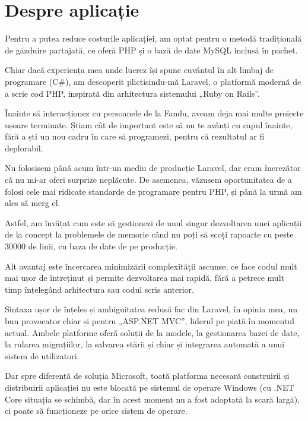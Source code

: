\section*{Despre aplicație}
	Pentru a putea reduce costurile aplicației, am optat pentru o metodă tradițională de găzduire partajată, ce oferă PHP și o bază de date MySQL inclusă în pachet.

	Chiar dacă experiența mea unde lucrez își spune cuvântul în alt limbaj de programare (C\#), am descoperit plictisindu-mă Laravel\cite{laravel}, o platformă modernă de a scrie cod PHP, inspirată din arhitectura sistemului „Ruby on Rails”.

	Înainte să interacționez cu persoanele de la Fandu, aveam deja mai multe proiecte ușoare terminate.
	Știam cât de important este să nu te avânți cu capul înainte, fără a ști un nou cadru în care să programezi, pentru că rezultatul ar fi deplorabil.

	Nu folosisem până acum într-un mediu de producție Laravel, dar eram încrezător că nu mi-ar oferi surprize neplăcute.
	De asemenea, văzusem oportunitatea de a folosi cele mai ridicate standarde de programare pentru PHP, și până la urmă am ales să merg el.

	Astfel, am învățat cum este să gestionezi de unul singur dezvoltarea unei aplicații de la concept la problemele de memorie când nu poți să scoți rapoarte cu peste 30000 de linii, cu baza de date de pe producție.

	Alt avantaj este încercarea minimizării complexității ascunse\cite{laravel_complexity}, ce face codul mult mai ușor de întreținut și permite dezvoltarea mai rapidă, fără a petrece mult timp înțelegând arhitectura sau codul scris anterior.

	Sintaxa ușor de înțeles și ambiguitatea redusă fac din Laravel, în opinia mea, un bun provocator chiar și pentru „ASP.NET MVC”\cite{hotframeworks}, liderul pe piață în momentul actual.
	Ambele platforme oferă soluții de la modele, la gestionarea bazei de date, la rularea migrațiilor, la salvarea stării și chiar și integrarea automată a unui sistem de utilizatori.

	Dar spre diferență de soluția Microsoft, toată platforma necesară construirii și distribuirii aplicației nu este blocată pe sistemul de operare Windows (cu .NET Core situația se schimbă, dar în acest moment nu a fost adoptată la scară largă), ci poate să funcționeze pe orice sistem de operare.
